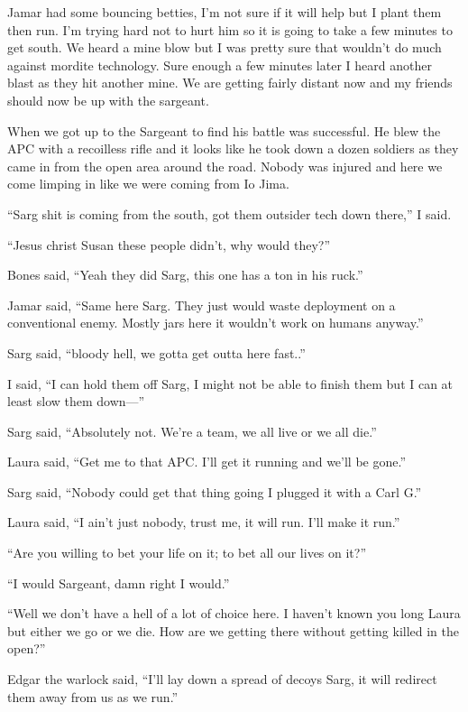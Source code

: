 Jamar had some bouncing betties, I'm not sure if it will help but I plant them then run. I'm trying hard not to hurt him so it is going to take a few minutes to get south. We heard a mine blow but I was pretty sure that wouldn't do much against mordite technology. Sure enough a few minutes later I heard another blast as they hit another mine. We are getting fairly distant now and my friends should now be up with the sargeant. 

When we got up to the Sargeant to find his battle was successful. He blew the APC with a recoilless rifle and it looks like he took down a dozen soldiers as they came in from the open area around the road. Nobody was injured and here we come limping in like we were coming from Io Jima.

``Sarg shit is coming from the south, got them outsider tech down there,'' I said.

``Jesus christ Susan these people didn't, why would they?''

Bones said, ``Yeah they did Sarg, this one has a ton in his ruck.''

Jamar said, ``Same here Sarg. They just would waste deployment on a conventional enemy. Mostly jars here it wouldn't work on humans anyway.''

Sarg said, ``bloody hell, we gotta get outta here fast..''

I said, ``I can hold them off Sarg, I might not be able to finish them but I can at least slow them down---''

Sarg said, ``Absolutely not. We're a team, we all live or we all die.''

Laura said, ``Get me to that APC. I'll get it running and we'll be gone.''

Sarg said, ``Nobody could get that thing going I plugged it with a Carl G.''

Laura said, ``I ain't just nobody, trust me, it will run. I'll make it run.''

``Are you willing to bet your life on it; to bet all our lives on it?''

``I would Sargeant, damn right I would.''

``Well we don't have a hell of a lot of choice here. I haven't known you long Laura but either we go or we die. How are we getting there  without getting killed in the open?''

Edgar the warlock said, ``I'll lay down a spread of decoys Sarg, it will redirect them away from us as we run.''

